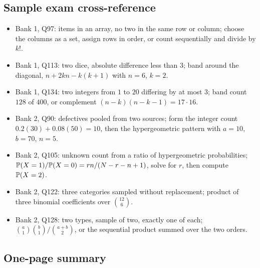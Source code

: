 \subsection{Sample exam cross-reference}

\begin{itemize}[nosep]
\item Bank 1, Q97: items in an array, no two in the same row or column; choose the columns
as a set, assign rows in order, or count sequentially and divide by $k!$.
\item Bank 1, Q113: two dice, absolute difference less than $3$; band around the diagonal,
$n + 2kn - k(k+1)$ with $n=6$, $k=2$.
\item Bank 1, Q134: two integers from $1$ to $20$ differing by at most $3$; band count
$128$ of $400$, or complement $(n-k)(n-k-1) = 17\cdot 16$.
\item Bank 2, Q90: defectives pooled from two sources; form the integer count
$0.2(30)+0.08(50) = 10$, then the hypergeometric pattern with $a=10$, $b=70$, $n=5$.
\item Bank 2, Q105: unknown count from a ratio of hypergeometric probabilities;
$\mathbb{P}(X=1)/\mathbb{P}(X=0) = rn/(N-r-n+1)$, solve for $r$, then compute $\mathbb{P}(X=2)$.
\item Bank 2, Q122: three categories sampled without replacement; product of three
binomial coefficients over $\binom{12}{6}$.
\item Bank 2, Q128: two types, sample of two, exactly one of each;
$\binom{a}{1}\binom{b}{1}/\binom{a+b}{2}$, or the sequential product summed over the two
orders.
\end{itemize}

\subsection{One-page summary}

